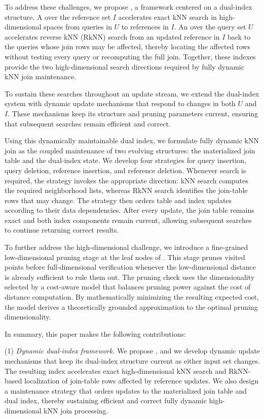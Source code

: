 To address these challenges, we propose \dualtree, a framework centered on a dual-index structure. A \deltatree over the reference set $I$ accelerates exact kNN search in high-dimensional spaces from queries in $U$ to references in $I$. An \hdrtree over the query set $U$ accelerates reverse kNN (RkNN) search from an updated reference in $I$ back to the queries whose join rows may be affected, thereby locating the affected rows without testing every query or recomputing the full join. Together, these indexes provide the two high-dimensional search directions required by fully dynamic kNN join maintenance.

To sustain these searches throughout an update stream, we extend the dual-index system with dynamic update mechanisms that respond to changes in both $U$ and $I$. These mechanisms keep its structure and pruning parameters current, ensuring that subsequent searches remain efficient and correct.

Using this dynamically maintainable dual index, we formulate fully dynamic kNN join as the coupled maintenance of two evolving structures: the materialized join table and the dual-index state. We develop four strategies for query insertion, query deletion, reference insertion, and reference deletion. Whenever search is required, the strategy invokes the appropriate direction: kNN search computes the required neighborhood lists, whereas RkNN search identifies the join-table rows that may change. The strategy then orders table and index updates according to their data dependencies. After every update, the join table remains exact and both index components remain current, allowing subsequent searches to continue returning correct results.

To further address the high-dimensional challenge, we introduce a fine-grained low-dimensional pruning stage at the leaf nodes of \dualtree. This stage prunes visited points before full-dimensional verification whenever the low-dimensional distance is already sufficient to rule them out. The pruning check uses the dimensionality selected by a cost-aware model that balances pruning power against the cost of distance computation. By mathematically minimizing the resulting expected cost, the model derives a theoretically grounded approximation to the optimal pruning dimensionality.

In summary, this paper makes the following contributions:

\noindent(1) \emph{Dynamic dual-index framework.}
We propose \dualtree, and we develop dynamic update mechanisms that keep its dual-index structure current as either input set changes. The resulting index accelerates exact high-dimensional kNN search and RkNN-based localization of join-table rows affected by reference updates. We also design a maintenance strategy that orders updates to the materialized join table and dual index, thereby sustaining efficient and correct fully dynamic high-dimensional kNN join processing.

